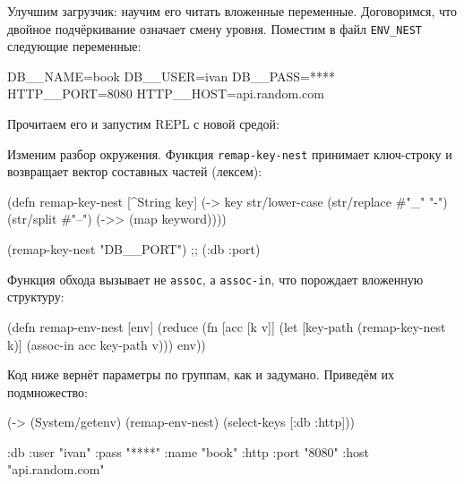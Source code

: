 Улучшим загрузчик: научим его читать вложенные переменные. Договоримся, что
двойное подчёркивание означает смену уровня. Поместим в файл \verb|ENV_NEST|
следующие переменные:

\begin{english}
  \begin{bash}
DB__NAME=book
DB__USER=ivan
DB__PASS=****
HTTP__PORT=8080
HTTP__HOST=api.random.com
  \end{bash}
\end{english}


\noindent
Прочитаем его и запустим REPL с новой средой:

\begin{english}
\end{english}

Изменим разбор окружения. Функция \verb|remap-key-nest| принимает ключ-строку и
возвращает вектор составных частей (лексем):

\begin{english}
  \begin{clojure}
(defn remap-key-nest
  [^String key]
  (-> key
      str/lower-case
      (str/replace #"_" "-")
      (str/split #"--")
      (->> (map keyword))))

(remap-key-nest "DB__PORT")
;; (:db :port)
  \end{clojure}
\end{english}


\noindent
Функция обхода вызывает не \verb|assoc|, а \verb|assoc-in|, что порождает
вложенную структуру:

\begin{english}
  \begin{clojure}
(defn remap-env-nest
  [env]
  (reduce
   (fn [acc [k v]]
     (let [key-path (remap-key-nest k)]
       (assoc-in acc key-path v)))
   {}
   env))
  \end{clojure}
\end{english}

Код ниже вернёт параметры по группам, как и задумано. Приведём их подмножество:

\ifx\devicetype\mobile

\begin{english}
  \begin{clojure}
(-> (System/getenv)
    (remap-env-nest)
    (select-keys [:db :http]))

{:db {:user "ivan"
      :pass "****"
      :name "book"}
 :http {:port "8080"
        :host "api.random.com"}}
  \end{clojure}
\end{english}

